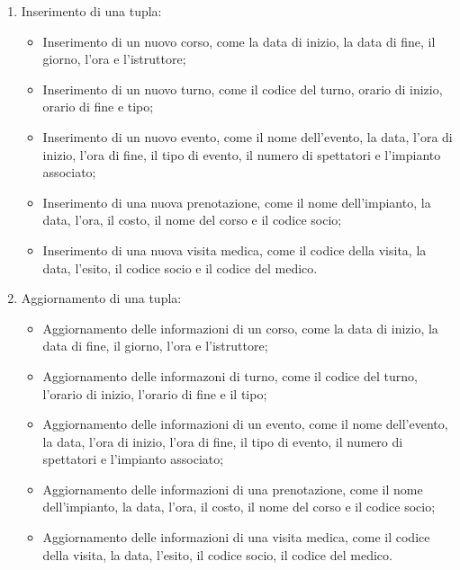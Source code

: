\documentclass{article}
\begin{document}
    \begin{flushleft}
        \begin{enumerate}
            \item Inserimento di una tupla: \\
            \begin{itemize}
                \item Inserimento di un nuovo corso, come la data di inizio, la data di fine, il giorno, l'ora e l'istruttore;
                \item Inserimento di un nuovo turno, come il codice del turno, orario di inizio, orario di fine e tipo;
                \item Inserimento di un nuovo evento, come il nome dell'evento, la data, l'ora di inizio, l'ora di fine, il tipo di evento, il numero di spettatori e l'impianto associato;
                \item Inserimento di una nuova prenotazione, come il nome dell'impianto, la data, l'ora, il costo, il nome del corso e il codice socio;
                \item Inserimento di una nuova visita medica, come il codice della visita, la data, l'esito, il codice socio e il codice del medico.
            \end{itemize}
            \item Aggiornamento di una tupla: \\
            \begin{itemize}
                \item Aggiornamento delle informazioni di un corso, come la data di inizio, la data di fine, il giorno, l'ora e l'istruttore;
                \item Aggiornamento delle informazoni di turno, come il codice del turno, l'orario di inizio, l'orario di fine e il tipo;
                \item Aggiornamento delle informazioni di un evento, come il nome dell'evento, la data, l'ora di inizio, l'ora di fine, il tipo di evento, il numero di spettatori e l'impianto associato;
                \item Aggiornamento delle informazioni di una prenotazione, come il nome dell'impianto, la data, l'ora, il costo, il nome del corso e il codice socio;
                \item Aggiornamento delle informazioni di una visita medica, come il codice della visita, la data, l'esito, il codice socio, il codice del medico.
            \end{itemize}

\end{enumerate}
\end{flushleft}
\end{document}
